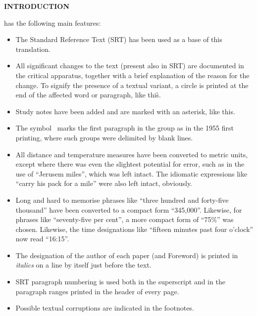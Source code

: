 \thispagestyle{empty}

\makeatletter
{}%
\makeatother

\begin{center}
\LARGE\bfseries
INTRODUCTION
\end{center}


 has the following main features:

\begin{itemize}
\item The Standard Reference Text (SRT) has been used as a base of this translation.
\item All significant changes to the text (present also in SRT) are documented in the critical apparatus, together with a brief explanation of the reason for the change. To signify the presence of a textual variant, a circle is printed at the end of the affected word or paragraph, like this\r{}.
\item Study notes have been added and are marked with an asterisk, like this\ts{*}.
\item The symbol \pc\ marks the first paragraph in the group as in the 1955 first printing, where such groups were delimited by blank lines.
\item All distance and temperature measures have been converted to metric units, except where there was even the slightest potential for error, such as in the use of ``Jerusem miles'', which was left intact. The idiomatic expressions like ``carry his pack for a mile'' were also left intact, obviously.
\item Long and hard to memorise phrases like ``three hundred and forty\hyp{}five thousand'' have been converted to a compact form ``345,000''. Likewise, for phrases like ``seventy\hyp{}five per cent'', a more compact form of ``75\%'' was chosen. Likewise, the time designations like ``fifteen minutes past four o’clock'' now read ``16:15''.
\item The designation of the author of each paper (and Foreword) is printed in \textit{italics} on a line by itself just before the text.
\item SRT paragraph numbering is used both in the superscript and in the paragraph ranges printed in the head\-er of every page.
\item Possible textual corruptions are indicated in the footnotes.
\end{itemize}

